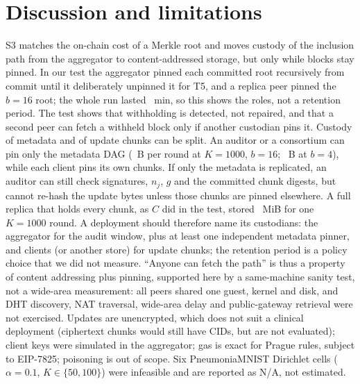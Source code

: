 \documentclass[final,3p,times,twocolumn]{elsarticle}
\begin{document}
\section{Discussion and limitations}\label{sec:disc}
S3 matches the on-chain cost of a Merkle root and moves custody of the inclusion path from the aggregator to content-addressed storage, but only while blocks stay pinned. In our test the aggregator pinned each committed root recursively from commit until it deliberately unpinned it for T5, and a replica peer pinned the $b=16$ root; the whole run lasted ~min, so this shows the roles, not a retention period. The test shows that withholding is detected, not repaired, and that a second peer can fetch a withheld block only if another custodian pins it. Custody of metadata and of update chunks can be split. An auditor or a consortium can pin only the metadata DAG (~B per round at $K=1000$, $b=16$; ~B at $b=4$), while each client pins its own chunks. If only the metadata is replicated, an auditor can still check signatures, $n_j$, $g$ and the committed chunk digests, but cannot re-hash the update bytes unless those chunks are pinned elsewhere. A full replica that holds every chunk, as $C$ did in the test, stored ~MiB for one $K=1000$ round. A deployment should therefore name its custodians: the aggregator for the audit window, plus at least one independent metadata pinner, and clients (or another store) for update chunks; the retention period is a policy choice that we did not measure. ``Anyone can fetch the path'' is thus a property of content addressing plus pinning, supported here by a same-machine sanity test, not a wide-area measurement: all peers shared one guest, kernel and disk, and DHT discovery, NAT traversal, wide-area delay and public-gateway retrieval were not exercised. Updates are unencrypted, which does not suit a clinical deployment (ciphertext chunks would still have CIDs, but are not evaluated); client keys were simulated in the aggregator; gas is exact for Prague rules, subject to EIP-7825; poisoning is out of scope. Six PneumoniaMNIST Dirichlet cells ($\alpha=0.1$, $K\in\{50,100\}$) were infeasible and are reported as N/A, not estimated.
\end{document}
